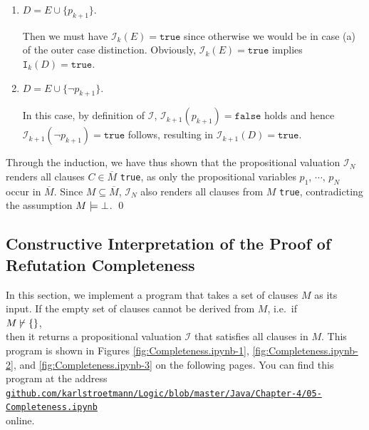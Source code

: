 \begin{enumerate}
\begin{enumerate}
\begin{enumerate}[1.]
          In this case, $\mathcal{I}_{k+1} = \mathtt{true}$ already holds by the induction hypothesis.        
    \item $D = E \cup \{ p_{k+1} \}$.

          Then we must have $\mathcal{I}_k(E) = \mathtt{true}$ since otherwise we would be in case (a) of the
          outer case distinction.  Obviously, $\mathcal{I}_k(E) = \mathtt{true}$ implies $\mathtt{I}_k(D) = \mathtt{true}$.
    \item $D = E \cup \{ \neg p_{k+1} \}$.

          In this case, by definition of $\mathcal{I}$, $\mathcal{I}_{k+1}(p_{k+1}) = \mathtt{false}$
          holds and hence $\mathcal{I}_{k+1}(\neg p_{k+1}) = \mathtt{true}$ follows, resulting in
          $\mathcal{I}_{k+1}(D) = \mathtt{true}$.
    \end{enumerate}
    
    Through the induction, we have thus shown that the propositional valuation
    $\mathcal{I}_{N}$ renders all clauses $C \in \overline{M}$ \texttt{true}, as only the
    propositional variables $p_1$, $\cdots$, $p_N$ occur in $\overline{M}$.
    Since $M \subseteq \overline{M}$, $\mathcal{I}_{N}$ also renders all clauses from $M$ \texttt{true}, 
    contradicting the assumption $M \models \bot$. \qed
  \end{enumerate}
\end{enumerate}

\subsection{Constructive Interpretation of the Proof of Refutation Completeness}
In this section, we implement a program that takes a set of clauses $M$ as its input.
If the empty set of clauses cannot be derived from $M$, i.e.~if
\\[0.2cm]
\hspace*{1.3cm}
$M\, {\not}\!\vdash \{\}$,
\\[0.2cm]
then it returns a propositional valuation $\mathcal{I}$ that satisfies all clauses in $M$.
This program is shown in Figures \ref{fig:Completeness.ipynb-1}, \ref{fig:Completeness.ipynb-2}, and \ref{fig:Completeness.ipynb-3} on the following pages. You can find this program at the address
\\[0.2cm]
\href{https://github.com/karlstroetmann/Logic/blob/master/Java/Chapter-4/05-Completeness.ipynb}{\small\texttt{github.com/karlstroetmann/Logic/blob/master/Java/Chapter-4/05-Completeness.ipynb}}
\\[0.2cm]
online.

